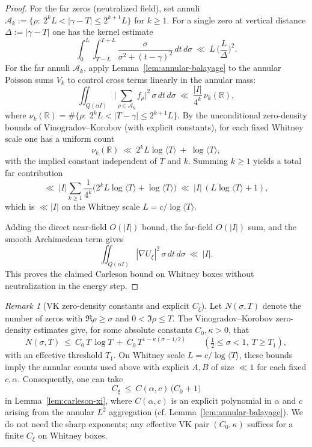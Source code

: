 \documentclass[11pt]{article}
\theoremstyle{definition}
\theoremstyle{remark}
\newtheorem{remark}[theorem]{Remark}
\newcommand{\R}{\mathbb{R}}
\begin{document}
\begin{proof}
For the far zeros (neutralized field), set annuli $\mathcal A_k:=\{\rho:\ 2^kL<|\gamma-T|\le 2^{k+1}L\}$ for $k\ge1$. For a single zero at vertical distance $\Delta:=|\gamma-T|$ one has the kernel estimate
\[
 \int_0^{L}\!\int_{T-L}^{T+L} \frac{\sigma}{\sigma^2+(t-\gamma)^2}\,dt\,d\sigma\ \ll\ L\,\Big(\frac{L}{\Delta}\Big)^{\!2}.
\]
For the far annuli $\mathcal A_k$, apply Lemma~\ref{lem:annular-balayage} to the annular Poisson sums $V_k$ to control cross terms linearly in the annular mass:
\[
  \iint_{Q(\alpha I)}\Big|\sum_{\rho\in\mathcal A_k} f_{\rho}\Big|^2\,\sigma\,dt\,d\sigma\ \ll\ \frac{|I|}{4^k}\,\nu_k(\R),
\]
where $\nu_k(\R)=\#\{\rho:\ 2^kL<|T-\gamma|\le 2^{k+1}L\}$. By the unconditional zero-density bounds of Vinogradov–Korobov (with explicit constants), for each fixed Whitney scale one has a uniform count
\[ \nu_k(\R)\ \ll\ 2^kL\log\langle T\rangle\ +\ \log\langle T\rangle, \]
with the implied constant independent of $T$ and $k$.
Summing $k\ge1$ yields a total far contribution
\[ \ll\ |I|\sum_{k\ge1}\frac{1}{4^k}\big(2^kL\log\langle T\rangle+\log\langle T\rangle\big)\ \ll\ |I|\,(L\log\langle T\rangle+1), \]
which is $\ll |I|$ on the Whitney scale $L=c/\log\langle T\rangle$.

Adding the direct near-field $O(|I|)$ bound, the far-field $O(|I|)$ sum, and the smooth Archimedean term gives
\[
 \iint_{Q(\alpha I)} |\nabla U_\xi|^2\,\sigma\,dt\,d\sigma\ \ll\ |I|.
\]
This proves the claimed Carleson bound on Whitney boxes without neutralization in the energy step.
\end{proof}
\begin{remark}[VK zero-density constants and explicit $C_\xi$]
Let $N(\sigma,T)$ denote the number of zeros with $\Re\rho\ge \sigma$ and $0<\Im\rho\le T$. The Vinogradov–Korobov zero-density estimates give, for some absolute constants $C_0,\kappa>0$, that
\[
  N(\sigma,T)\ \le\ C_0\,T\,\log T\ +\ C_0\,T^{1-\kappa(\sigma-1/2)}\qquad (\tfrac12\le \sigma<1,\ T\ge T_1),
\]
with an effective threshold $T_1$. On Whitney scale $L=c/\log\langle T\rangle$, these bounds imply the annular counts used above with explicit $A,B$ of size $\ll 1$ for each fixed $c,\alpha$. Consequently, one can take
\[
  C_\xi\ \le\ C(\alpha,c)\,\big(C_0+1\big)
\]
in Lemma~\ref{lem:carleson-xi}, where $C(\alpha,c)$ is an explicit polynomial in $\alpha$ and $c$ arising from the annular $L^2$ aggregation (cf. Lemma~\ref{lem:annular-balayage}). We do not need the sharp exponents; any effective VK pair $(C_0,\kappa)$ suffices for a finite $C_\xi$ on Whitney boxes.
\end{remark}
\end{document}
